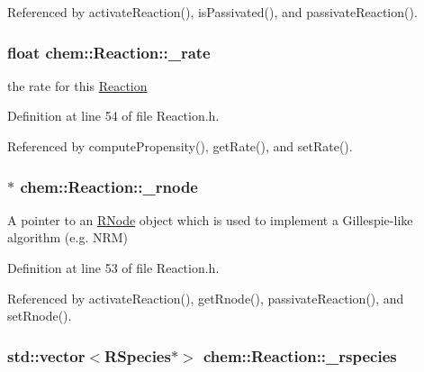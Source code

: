Referenced by activate\-Reaction(), is\-Passivated(), and passivate\-Reaction().

\hypertarget{classchem_1_1Reaction_a6c5cd99c16816bfcbee48b8c78a0efe5}{
\subsubsection[{\-\_\-rate}]{\setlength{\rightskip}{0pt plus 5cm}float {\bf chem\-::\-Reaction\-::\-\_\-rate}}}\label{classchem_1_1Reaction_a6c5cd99c16816bfcbee48b8c78a0efe5}


the rate for this \hyperlink{classchem_1_1Reaction}{Reaction} 



Definition at line 54 of file Reaction.\-h.



Referenced by compute\-Propensity(), get\-Rate(), and set\-Rate().

\hypertarget{classchem_1_1Reaction_ae10d6d1a25e37bc4b3b5df478094e745}{
\subsubsection[{\-\_\-rnode}]{$\ast$ {\bf chem\-::\-Reaction\-::\-\_\-rnode}}}\label{classchem_1_1Reaction_ae10d6d1a25e37bc4b3b5df478094e745}


A pointer to an \hyperlink{classchem_1_1RNode}{R\-Node} object which is used to implement a Gillespie-\/like algorithm (e.\-g. N\-R\-M) 



Definition at line 53 of file Reaction.\-h.



Referenced by activate\-Reaction(), get\-Rnode(), passivate\-Reaction(), and set\-Rnode().

\hypertarget{classchem_1_1Reaction_a5a8f536126edeb82526f9ac31c3e3c6c}{
\subsubsection[{\-\_\-rspecies}]{\setlength{\rightskip}{0pt plus 5cm}std\-::vector$<${\bf R\-Species}$\ast$$>$ {\bf chem\-::\-Reaction\-::\-\_\-rspecies}}}\label{classchem_1_1Reaction_a5a8f536126edeb82526f9ac31c3e3c6c}


